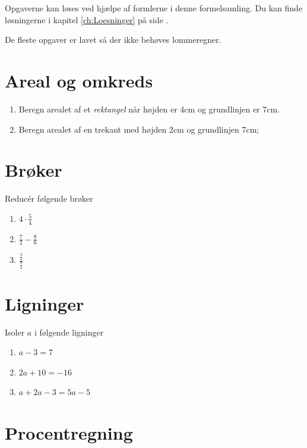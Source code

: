 \documentclass[11pt,a5paper,fleqn,leqno]{book}
\begin{document}
Opgaverne kan løses ved hjælpe af formlerne i denne formelsamling. Du kan finde løsningerne i kapitel \ref{ch:Loesninger} på side \pageref{ch:Loesninger}.

De fleste opgaver er lavet så der ikke behøves lommeregner.

\newpage

\section{Areal og omkreds}

\begin{enumerate}
\item \label{op:areal_1} Beregn arealet af et \textit{rektangel} når højden er 4cm og grundlinjen er 7cm.
\item \label{op:areal_2} Beregn arealet af en trekant med højden 2cm og grundlinjen 7cm;
\end{enumerate}

\section{Brøker}

Reducér følgende brøker

\begin{enumerate}
\item \label{op:broek_1} $4 \cdot \frac{5}{4}$
\item \label{op:broek_2} $\frac{7}{2} - \frac{8}{6}$
\item \label{op:broek_3} $\frac{\frac{3}{4}}{\frac{9}{4}}$
\end{enumerate}

\section{Ligninger}

Isoler $a$ i følgende ligninger

\begin{enumerate}
\item \label{op:ligning_1} $a-3=7$
\item \label{op:ligning_2} $2a+10=-16$
\item \label{op:ligning_3} $a+2a-3 = 5a -5$
\end{enumerate}

\section{Procentregning}
\end{document}
